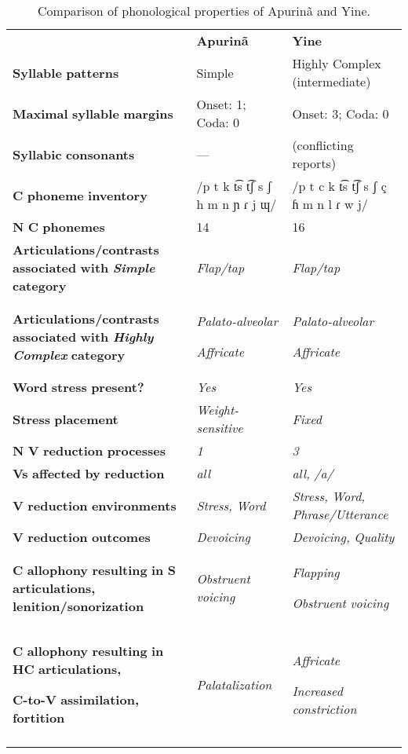 \begin{table}
\begin{tabularx}{\textwidth}{XXX}
\lsptoprule
 & \textbf{Apurinã} & \textbf{Yine}\\
 \textbf{Syllable} \textbf{patterns} & Simple & Highly Complex (intermediate)\\
 \textbf{Maximal} \textbf{syllable} \textbf{margins} & Onset: 1; Coda: 0 & Onset: 3; Coda: 0\\
 \textbf{Syllabic} \textbf{consonants} & — & (conflicting reports)\\
 \textbf{C} \textbf{phoneme} \textbf{inventory} & /p t k t͡s t͡ʃ s ʃ h m n ɲ ɾ j ɰ/ & /p t c k t͡s t͡ʃ s ʃ ç ɦ m n l ɾ w j/\\
 \textbf{N} \textbf{C} \textbf{phonemes} & 14 & 16\\
 \textbf{Articulations/contrasts} \textbf{associated} \textbf{with} \textbf{\textit{Simple}} \textbf{category} & \textit{Flap/tap} & \textit{Flap/tap}\\
 \textbf{Articulations/contrasts} \textbf{associated} \textbf{with} \textbf{\textit{Highly} \textit{Complex}} \textbf{category} & { \textit{Palato-alveolar}}

 \textit{Affricate} & { \textit{Palato-alveolar}}

 \textit{Affricate}\\
 \textbf{Word} \textbf{stress} \textbf{present?} & \textit{Yes} & \textit{Yes}\\
 \textbf{Stress} \textbf{placement} & \textit{Weight-sensitive} & \textit{Fixed}\\
 \textbf{N} \textbf{V} \textbf{reduction} \textbf{processes} & \textit{1} & \textit{3}\\
 \textbf{Vs} \textbf{affected} \textbf{by} \textbf{reduction}  & \textit{all} & \textit{all,} \textit{/a/}\\
 \textbf{V} \textbf{reduction} \textbf{environments} & \textit{Stress,} \textit{Word} & \textit{Stress,} \textit{Word,} \textit{Phrase/Utterance}\\
 \textbf{V} \textbf{reduction} \textbf{outcomes} & \textit{Devoicing} & \textit{Devoicing,} \textit{Quality}\\
 \textbf{C} \textbf{allophony} \textbf{resulting} \textbf{in} \textbf{S} \textbf{articulations,} \textbf{lenition/sonorization} & \textit{Obstruent} \textit{voicing} & { \textit{Flapping}}

 \textit{Obstruent} \textit{voicing}\\
{ \textbf{C} \textbf{allophony} \textbf{resulting} \textbf{in} \textbf{HC} \textbf{articulations,} }

 \textbf{C-to-V} \textbf{assimilation,} \textbf{fortition} & \textit{Palatalization} & { \textit{Affricate}}

 \textit{Increased} \textit{constriction}\\
\lspbottomrule
\end{tabularx}
\caption{\label{8.3}Comparison of phonological properties of Apurinã and Yine.}
\end{table}


